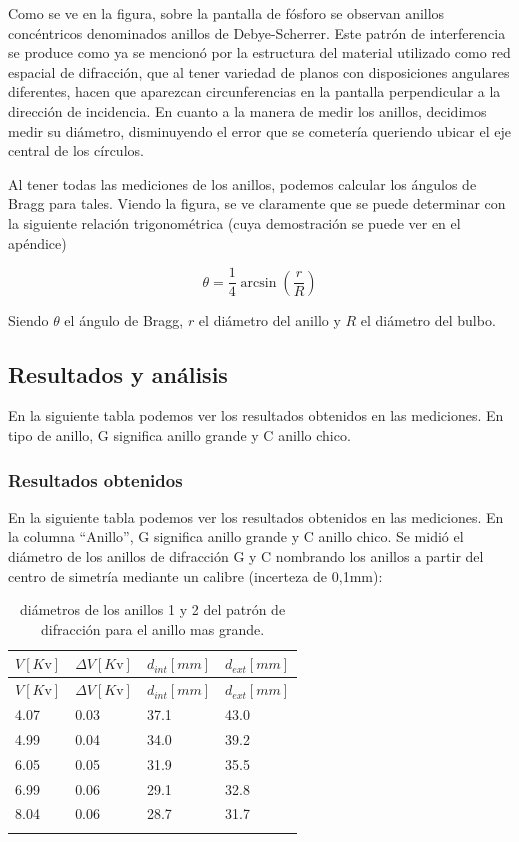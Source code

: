 \documentclass[]{article}
\begin{document}
Como se ve en la figura, sobre la pantalla de fósforo se observan
anillos concéntricos denominados anillos de Debye-Scherrer. Este patrón
de interferencia se produce como ya se mencionó por la estructura del
material utilizado como red espacial de difracción, que al tener
variedad de planos con disposiciones angulares diferentes, hacen que
aparezcan circunferencias en la pantalla perpendicular a la dirección de
incidencia. En cuanto a la manera de medir los anillos, decidimos medir
su diámetro, disminuyendo el error que se cometería queriendo ubicar el
eje central de los círculos.

Al tener todas las mediciones de los anillos, podemos calcular los
ángulos de Bragg para tales. Viendo la figura, se ve claramente que se
puede determinar con la siguiente relación trigonométrica (cuya
demostración se puede ver en el apéndice)

\[\theta = \frac{1}{4} \arcsin\left (\frac{r}{R} \right )\]

Siendo \(\theta\) el ángulo de Bragg, \(r\) el diámetro del anillo y
\(R\) el diámetro del bulbo.

\hypertarget{resultados-y-anuxe1lisis}{%
\subsection{Resultados y análisis}\label{resultados-y-anuxe1lisis}}

En la siguiente tabla podemos ver los resultados obtenidos en las
mediciones. En tipo de anillo, G significa anillo grande y C anillo
chico.

\hypertarget{resultados-obtenidos}{%
\subsubsection{Resultados obtenidos}\label{resultados-obtenidos}}

En la siguiente tabla podemos ver los resultados obtenidos en las
mediciones. En la columna ``Anillo'', G significa anillo grande y C
anillo chico. Se midió el diámetro de los anillos de difracción G y C
nombrando los anillos a partir del centro de simetría mediante un
calibre (incerteza de 0,1mm):

\begin{longtable}[]{@{}llll@{}}
\toprule
\(V[K\mathrm{v}]\) & \(\Delta V[K\mathrm{v}]\) & \(d_{int}[mm]\) &
\(d_{ext}[mm]\)\tabularnewline
\midrule
\endfirsthead
\toprule
\(V[K\mathrm{v}]\) & \(\Delta V[K\mathrm{v}]\) & \(d_{int}[mm]\) &
\(d_{ext}[mm]\)\tabularnewline
\midrule
\endhead
4.07 & 0.03 & 37.1 & 43.0\tabularnewline
4.99 & 0.04 & 34.0 & 39.2\tabularnewline
6.05 & 0.05 & 31.9 & 35.5\tabularnewline
6.99 & 0.06 & 29.1 & 32.8\tabularnewline
8.04 & 0.06 & 28.7 & 31.7\tabularnewline
\bottomrule
\caption{diámetros de los anillos 1 y 2 del patrón de difracción para el
anillo mas grande.}\tabularnewline
\end{longtable}
\end{document}
